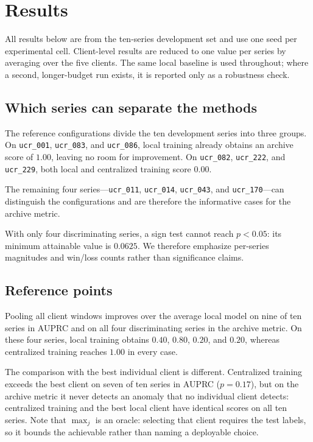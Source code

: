 \documentclass[conference]{IEEEtran}
\begin{document}
\section{Results}
\label{sec:results}

All results below are from the ten-series development set and use one seed per experimental cell. Client-level results are reduced to one value per series by averaging over the five clients. The same local baseline is used throughout; where a second, longer-budget run exists, it is reported only as a robustness check.

\subsection{Which series can separate the methods}
\label{subsec:discriminating}

The reference configurations divide the ten development series into three groups. On \texttt{ucr\_001}, \texttt{ucr\_083}, and \texttt{ucr\_086}, local training already obtains an archive score of $1.00$, leaving no room for improvement. On \texttt{ucr\_082}, \texttt{ucr\_222}, and \texttt{ucr\_229}, both local and centralized training score $0.00$.

The remaining four series---\texttt{ucr\_011}, \texttt{ucr\_014}, \texttt{ucr\_043}, and \texttt{ucr\_170}---can distinguish the configurations and are therefore the informative cases for the archive metric.

With only four discriminating series, a sign test cannot reach $p<0.05$: its minimum attainable value is $0.0625$. We therefore emphasize per-series magnitudes and win/loss counts rather than significance claims.

\subsection{Reference points}
\label{subsec:reference}

Pooling all client windows improves over the average local model on nine of ten series in AUPRC and on all four discriminating series in the archive metric. On these four series, local training obtains $0.40$, $0.80$, $0.20$, and $0.20$, whereas centralized training reaches $1.00$ in every case.

The comparison with the best individual client is different. Centralized training exceeds the best client on seven of ten series in AUPRC ($p=0.17$), but on the archive metric it never detects an anomaly that no individual client detects: centralized training and the best local client have identical scores on all ten series. Note that $\max_j$ is an oracle: selecting that client requires the test labels, so it bounds the achievable rather than naming a deployable choice.
\end{document}
